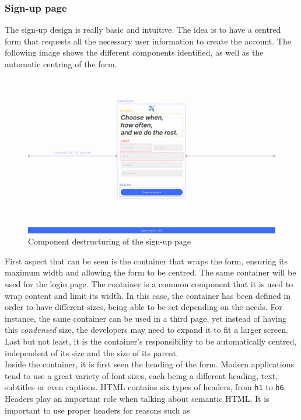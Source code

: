 \documentclass[./memory.tex]{subfiles}
\begin{document}
\subsubsection{Sign-up page}
The sign-up design is really basic and intuitive. The idea is to have a centred
form that requests all the necessary user information to create the account. The
following image shows the different components identified, as well as the
automatic centring of the form.
\begin{figure}[H]
	\centering
	\includegraphics[width=\textwidth]{./assets/designs/sign-up-components.png}
	\caption{Component destructuring of the sign-up page}
\end{figure}
First aspect that can be seen is the container that wraps the form, ensuring
its maximum width and allowing the form to be centred. The same container will
be used for the login page. The container is a common component that it is used
to wrap content and limit its width. In this case, the container has been
defined in order to have different sizes, being able to be set depending on the
needs. For instance, the same container can be used in a third page, yet instead
of having this \emph{condensed} size, the developers may need to expand it to
fit a larger screen. Last but not least, it is the container's responsibility to
be automatically centred, independent of its size and the size of its parent.
\\[8pt]
Inside the container, it is first seen the heading of the form. Modern
applications tend to use a great variety of font sizes, each being a different
heading, text, subtitles or even captions. HTML contains six types of headers,
from \texttt{h1} to \texttt{h6}. Headers play an important role when talking
about semantic HTML. It is important to use proper headers for reasons such as
\end{document}
